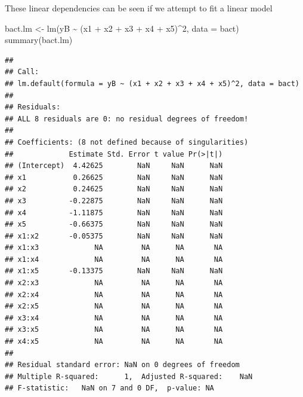 \documentclass[
  ignorenonframetext,
]{beamer}
\newenvironment{Shaded}{\begin{snugshade}}{\end{snugshade}}
\newcommand{\AttributeTok}[1]{\textcolor[rgb]{0.77,0.63,0.00}{#1}}
\newcommand{\DecValTok}[1]{\textcolor[rgb]{0.00,0.00,0.81}{#1}}
\newcommand{\FunctionTok}[1]{\textcolor[rgb]{0.00,0.00,0.00}{#1}}
\newcommand{\NormalTok}[1]{#1}
\newcommand{\OtherTok}[1]{\textcolor[rgb]{0.56,0.35,0.01}{#1}}
\newcommand{\SpecialCharTok}[1]{\textcolor[rgb]{0.00,0.00,0.00}{#1}}
\begin{document}
\begin{frame}[fragile]{}
\protect\hypertarget{section-16}{}
These linear dependencies can be seen if we attempt to fit a linear
model

\begin{Shaded}
\begin{Highlighting}[]
\NormalTok{bact.lm }\OtherTok{\textless{}{-}} \FunctionTok{lm}\NormalTok{(yB }\SpecialCharTok{\textasciitilde{}}\NormalTok{ (x1 }\SpecialCharTok{+}\NormalTok{ x2 }\SpecialCharTok{+}\NormalTok{ x3 }\SpecialCharTok{+}\NormalTok{ x4 }\SpecialCharTok{+}\NormalTok{ x5)}\SpecialCharTok{\^{}}\DecValTok{2}\NormalTok{, }\AttributeTok{data =}\NormalTok{ bact)}
\FunctionTok{summary}\NormalTok{(bact.lm)}
\end{Highlighting}
\end{Shaded}

\begin{verbatim}
## 
## Call:
## lm.default(formula = yB ~ (x1 + x2 + x3 + x4 + x5)^2, data = bact)
## 
## Residuals:
## ALL 8 residuals are 0: no residual degrees of freedom!
## 
## Coefficients: (8 not defined because of singularities)
##             Estimate Std. Error t value Pr(>|t|)
## (Intercept)  4.42625        NaN     NaN      NaN
## x1           0.26625        NaN     NaN      NaN
## x2           0.24625        NaN     NaN      NaN
## x3          -0.22875        NaN     NaN      NaN
## x4          -1.11875        NaN     NaN      NaN
## x5          -0.66375        NaN     NaN      NaN
## x1:x2       -0.05375        NaN     NaN      NaN
## x1:x3             NA         NA      NA       NA
## x1:x4             NA         NA      NA       NA
## x1:x5       -0.13375        NaN     NaN      NaN
## x2:x3             NA         NA      NA       NA
## x2:x4             NA         NA      NA       NA
## x2:x5             NA         NA      NA       NA
## x3:x4             NA         NA      NA       NA
## x3:x5             NA         NA      NA       NA
## x4:x5             NA         NA      NA       NA
## 
## Residual standard error: NaN on 0 degrees of freedom
## Multiple R-squared:      1,  Adjusted R-squared:    NaN 
## F-statistic:   NaN on 7 and 0 DF,  p-value: NA
\end{verbatim}
\end{frame}
\end{document}
